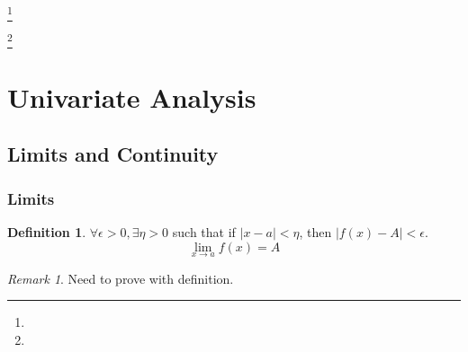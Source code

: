 \documentclass{amsproc}
\theoremstyle{definition}
\newtheorem{definition}[theorem]{Definition}
\theoremstyle{remark}
\newtheorem*{remark*}{Remark}
\numberwithin{equation}{section}
\begin{document}
\title{}


\author{}
\address{}
\curraddr{}
\email{}
\thanks{}

\author{}
\address{}
\curraddr{}
\email{}
\thanks{}


\keywords{}

\date{}

\dedicatory{}

\begin{abstract}
\end{abstract}

\maketitle

\section[Univariate Analysis]{Univariate Analysis}

\subsection{Limits and Continuity}

\subsubsection{Limits}

\begin{definition}
    $\forall \epsilon > 0, \exists \eta >0$ such that if $|x - a| < \eta$, then $|f(x) - A| < \epsilon$.
    \begin{equation*}
        \lim_{x \to a} f(x) = A
    \end{equation*}
\end{definition}

\begin{remark*}
    Need to prove with definition.
\end{remark*}
\end{document}
